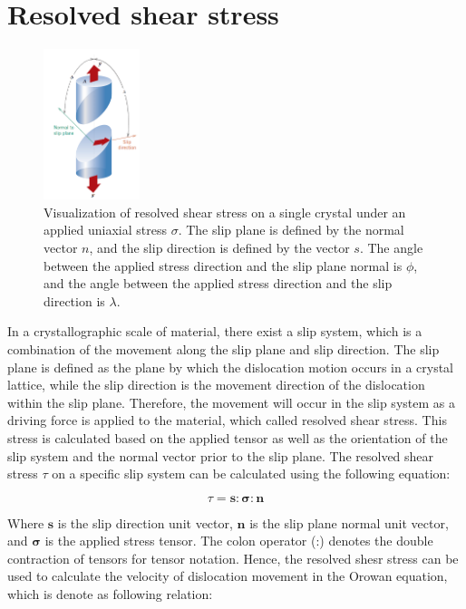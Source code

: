 \documentclass[12pt]{article}
\begin{document}
\section{Resolved shear stress}
\begin{figure}[H]
    \centering
    \includegraphics[width=0.25\textwidth]{images/RSS_New.png}
    \caption{Visualization of resolved shear stress on a single crystal under an applied uniaxial stress $\sigma$. 
    The slip plane is defined by the normal vector $n$, and the slip direction is defined by the vector $s$. 
    The angle between the applied stress direction and the slip plane normal is $\phi$, and the angle between 
    the applied stress direction and the slip direction is $\lambda$. \cite{callister2010}}
    \label{fig:resolved_shear_stress}
\end{figure}

\hspace{2em}In a crystallographic scale of material, there exist a slip system, which is a combination
of the movement along the slip plane and slip direction. The slip plane is defined as the plane by which 
the dislocation motion occurs in a crystal lattice, while the slip direction is the movement direction 
of the dislocation within the slip plane. Therefore, the movement will occur in the slip system as a driving
force is applied to the material, which called resolved shear stress. This stress is calculated based
on the applied tensor as well as the orientation of the slip system and the normal vector prior to the slip plane.
The resolved shear stress $\tau$ on a specific slip system can be calculated using the following equation:

\begin{equation}
    \tau = \boldsymbol{s} : \boldsymbol{\sigma} : \boldsymbol{n}
\end{equation}

Where $\boldsymbol{s}$ is the slip direction unit vector, $\boldsymbol{n}$ is the 
slip plane normal unit vector, and $\boldsymbol{\sigma}$ is the applied stress tensor. 
The colon operator (:) denotes the double contraction of tensors for tensor notation. Hence, the resolved shesr stress
can be used to calculate the velocity of dislocation movement in the Orowan equation, which is denote as following 
relation:
\end{document}
